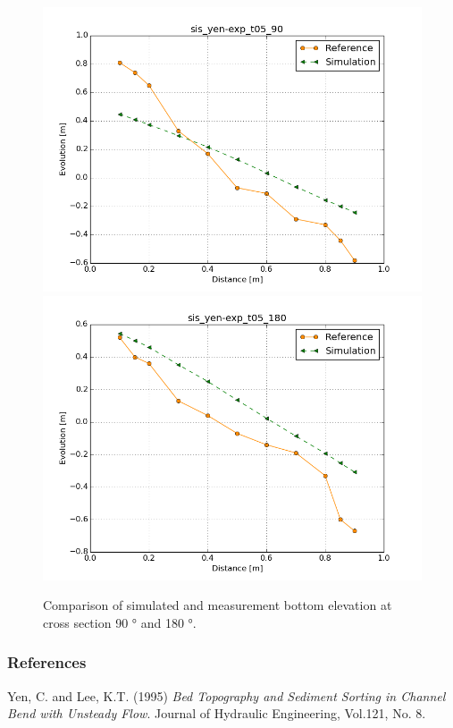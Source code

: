 \begin{figure} [!h]
\centering
\includegraphics[width=.96\textwidth]{../img/sis_yen-exp_90.png}
\includegraphics[width=.96\textwidth]{../img/sis_yen-exp_180.png}
 \caption{Comparison of simulated and measurement bottom elevation at cross section 90 ° and 180 °.}\label{fig:results2}
\end{figure}



\subsubsection{References}
%
Yen, C. and Lee, K.T. (1995) \textit{ Bed Topography and Sediment Sorting in Channel Bend 
with Unsteady Flow}. Journal of Hydraulic Engineering, Vol.121, No. 8.

